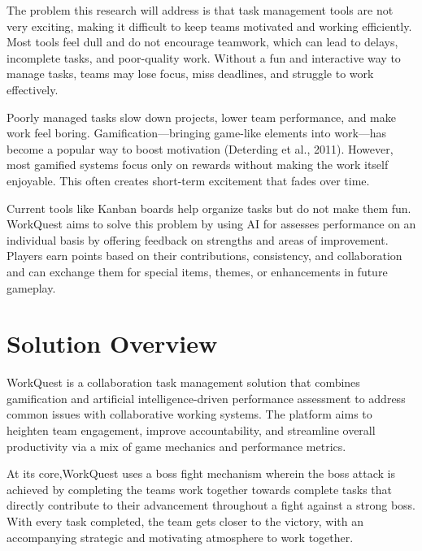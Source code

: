 The problem this research will address is that task management tools are not very exciting, making it difficult to keep teams motivated and working efficiently. Most tools feel dull and do not encourage teamwork, which can lead to delays, incomplete tasks, and poor-quality work. Without a fun and interactive way to manage tasks, teams may lose focus, miss deadlines, and struggle to work effectively.

Poorly managed tasks slow down projects, lower team performance, and make work feel boring. Gamification—bringing game-like elements into work—has become a popular way to boost motivation (Deterding et al., 2011). However, most gamified systems focus only on rewards without making the work itself enjoyable. This often creates short-term excitement that fades over time.

Current tools like Kanban boards help organize tasks but do not make them fun. WorkQuest aims to solve this problem by using AI for assesses performance on an individual basis by offering feedback on strengths and areas of improvement. Players earn points based on their contributions, consistency, and collaboration and can exchange them for special items, themes, or enhancements in future gameplay. 

\section{Solution Overview}
\label{section:solution-overview}

WorkQuest is a collaboration task management solution that combines gamification and artificial intelligence-driven 
performance assessment to address common issues with collaborative working systems. The platform aims to heighten team 
engagement, improve accountability, and streamline overall productivity via a mix of game mechanics and performance metrics.

At its core,WorkQuest uses a boss fight mechanism wherein the boss attack is achieved by completing the teams work together towards
complete tasks that directly contribute to their advancement throughout a fight against a strong boss. With every task completed, the team gets closer to the victory, with an accompanying strategic and motivating atmosphere to work together.

